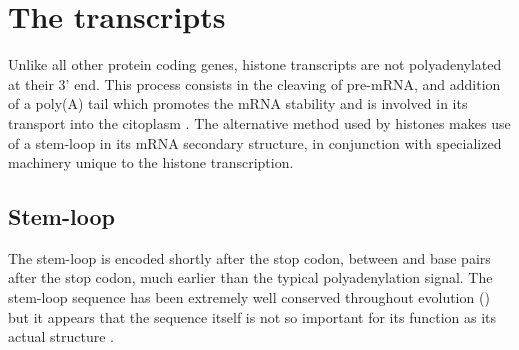 \section{The transcripts}

  Unlike all other protein coding genes, histone transcripts are not polyadenylated at
  their 3' end. This process consists in the cleaving of pre-mRNA, and addition of a
  poly(A) tail which promotes the mRNA stability and is involved in its transport
  into the citoplasm \citep{mRNA-end-processing}. The alternative method used by
  histones makes use of a stem-loop in its mRNA secondary structure, in conjunction
  with specialized machinery unique to the histone transcription.


  \subsection{Stem-loop}
    The stem-loop is encoded shortly after the stop codon, between \StemLoopStart{} and
    \StemLoopEnd{} base pairs after the stop codon, much earlier than the typical
    polyadenylation signal. The stem-loop sequence has been extremely well conserved
    throughout evolution () but it appears that the
    sequence itself is not so important for its function as its actual structure
    \citep{stem-loop-structure}.

